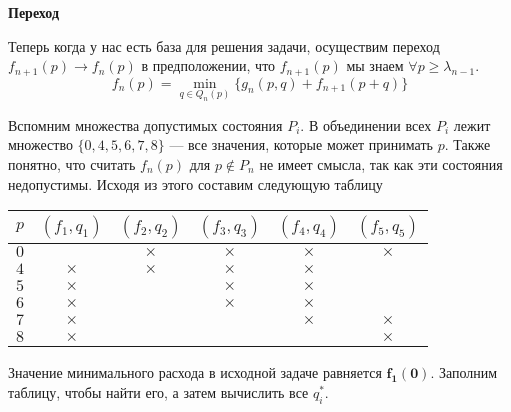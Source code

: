 \bigskip

\textbf{Переход}

Теперь когда у нас есть база для решения задачи, осуществим переход $f_{n+1}(p) \to f_n(p)$ в предположении, что $f_{n+1}(p)$ мы знаем $\forall p \ge \lambda_{n - 1}$.
\[
\boxed{f_n(p) = \min_{q \in Q_n(p)} \Big\{ g_n(p, q) + f_{n + 1}(p + q) \Big\}}\tag{**}
\]

Вспомним множества допустимых состояния $P_i$. В объединении всех $P_i$ лежит множество $\{0, 4, 5, 6, 7, 8\}$ --- все значения, которые может принимать $p$. Также понятно, что считать $f_n(p)$ для $p \notin P_n$ не имеет смысла, так как эти состояния недопустимы. Исходя из этого составим следующую таблицу

\begin{table}[H]
	\centering
	\begin{tabular}{ | c | c | c | c | c | c | } 
		\hline
		$p$ & $(f_1, q_1)$ & $(f_2, q_2)$ & $(f_3, q_3)$ & $(f_4, q_4)$ & $(f_5, q_5)$ \\ 
		\hline
		$0$ & & $\times$ & $\times$ & $\times$ & $\times$ \\\hline
		$4$ & $\times$ & $\times$ & $\times$ & $\times$ & \\\hline
		$5$ & $\times$ & & $\times$ & $\times$ & \\\hline
		$6$ & $\times$ & & $\times$ & $\times$ & \\\hline
		$7$ & $\times$ & & & $\times$ & $\times$ \\\hline
		$8$ & $\times$ & & & & $\times$ \\\hline
	\end{tabular}
\end{table}

Значение минимального расхода в исходной задаче равняется $\mathbf {f_1(0)}$. Заполним таблицу, чтобы найти его, а затем вычислить все $q^*_i$.

\bigskip

